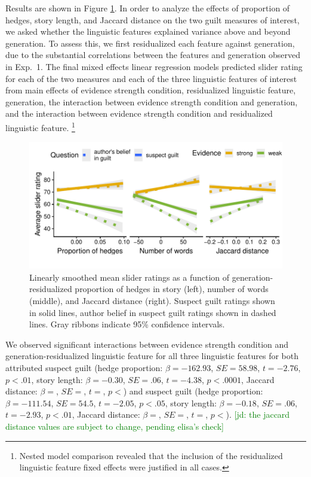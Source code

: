 \documentclass[10pt,letterpaper]{article}
\newcommand{\jd}[1]{\textcolor{Green}{[jd: #1]}}
\begin{document}
Results are shown in Figure \ref{fig:lingmarkers}. In order to analyze the effects of proportion of hedges, story length, and Jaccard distance on the two guilt measures of interest, we asked whether the linguistic features explained variance above and beyond generation. To assess this, we first residualized each feature against generation, due to the substantial correlations between the features and generation observed in Exp.~1. The final mixed effects linear regression models predicted slider rating for each of the two measures and each of the three linguistic features of interest from main effects of evidence strength condition, residualized linguistic feature, generation, the interaction between evidence strength condition and generation, and the interaction between evidence strength condition and residualized linguistic feature. \footnote{Nested model comparison revealed that the inclusion of the residualized linguistic feature fixed effects were justified in all cases.}

\begin{figure}[]
	\includegraphics[width=.5\textwidth]{pics/lingmarkers_resid}
	\caption{Linearly smoothed mean slider ratings as a function of generation-residualized proportion of hedges in story (left), number of words (middle), and Jaccard distance (right). Suspect guilt ratings shown in solid lines, author belief in suspect guilt ratings shown in dashed lines. Gray ribbons indicate 95\% confidence intervals.} 
	\label{fig:lingmarkers}
\end{figure}

We observed significant interactions between evidence strength condition and generation-residualized linguistic feature for all three linguistic features for both attributed suspect guilt (hedge proportion: $\beta = -162.93$, $SE = 58.98$, $t = -2.76$, $p < .01$, story length: $\beta = -0.30$, $SE = .06$, $t = -4.38$, $p < .0001$, Jaccard distance: $\beta = $, $SE = $, $t = $, $p < $) and suspect guilt (hedge proportion: $\beta = -111.54$, $SE = 54.5$, $t = -2.05$, $p < .05$, story length: $\beta = -0.18$, $SE = .06$, $t = -2.93$, $p < .01$, Jaccard distance: $\beta = $, $SE = $, $t = $, $p < $).  \jd{the jaccard distance values are subject to change, pending elisa's check}
\end{document}

